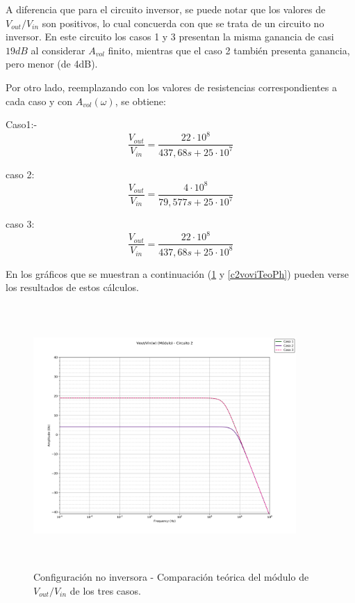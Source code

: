 A diferencia que para el circuito inversor, se puede notar que
 los valores de $V_{out}/V_{in}$ son positivos, lo cual concuerda con que se trata de un circuito no inversor. En este circuito los casos 1 y 3 presentan la misma ganancia de casi $19dB$ al considerar $A_{vol}$ finito, mientras que el caso 2 tambi\'en presenta ganancia, pero menor (de 4dB).


Por otro lado, reemplazando con los valores de resistencias correspondientes
 a cada caso y con $A_{vol}(\omega)$, se obtiene:

Caso1:-
\begin{equation}
	\frac{V_{out}}{V_{in}} = \frac{22 \cdot 10^8}{437,68 s + 25 \cdot 10^7}
	\label{c2c1vovi}
\end{equation}

caso 2:
\begin{equation}
	\frac{V_{out}}{V_{in}} = \frac{4 \cdot 10^8}{79,577 s + 25 \cdot 10^7}
	\label{c2c2vovi}
\end{equation}

caso 3:
\begin{equation}
	\frac{V_{out}}{V_{in}} = \frac{22 \cdot 10^8}{437,68 s + 25 \cdot 10^8}
	\label{c2c3vovi}
\end{equation}

En los gr\'aficos que se muestran a continuaci\'on (\ref{c2voviTeoMod} y \ref{c2voviTeoPh}) pueden verse los resultados de estos c\'alculos.

\begin{figure}[H] %
\centering
\includegraphics[width=10cm,height=10cm,keepaspectratio]{../EJ1/00GRAFICOS/teoricos/circ2voviw.png}
\caption{Configuración no inversora - Comparaci\'on te\'orica del m\'odulo de$V_{out}/V_{in}$ de los tres casos.}
\label{c2voviTeoMod}
\end{figure}

